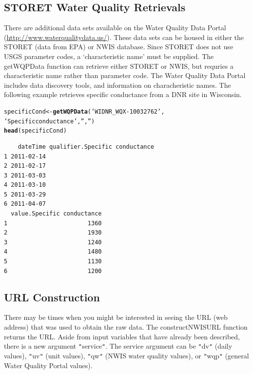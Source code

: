 \documentclass[a4paper,11pt]{article}\usepackage[]{graphicx}\usepackage[]{color}
\makeatletter
\newcommand{\hlstr}[1]{\textcolor[rgb]{0.192,0.494,0.8}{#1}}%
\newcommand{\hlstd}[1]{\textcolor[rgb]{0.345,0.345,0.345}{#1}}%
\newcommand{\hlkwb}[1]{\textcolor[rgb]{0.69,0.353,0.396}{#1}}%
\newcommand{\hlkwd}[1]{\textcolor[rgb]{0.737,0.353,0.396}{\textbf{#1}}}%
\newenvironment{kframe}{%
 \def\at@end@of@kframe{}%
 \ifinner\ifhmode%
  \def\at@end@of@kframe{\end{minipage}}%
  \begin{minipage}{\columnwidth}%
 \fi\fi%
 \def\FrameCommand##1{\hskip\@totalleftmargin \hskip-\fboxsep
 \colorbox{shadecolor}{##1}\hskip-\fboxsep
     \hskip-\linewidth \hskip-\@totalleftmargin \hskip\columnwidth}%
 \MakeFramed {\advance\hsize-\width
   \@totalleftmargin\z@ \linewidth\hsize
   \@setminipage}}%
 {\par\unskip\endMakeFramed%
 \at@end@of@kframe}
\newenvironment{knitrout}{}{} %
\makeatother
\begin{document}
\subsection{STORET Water Quality Retrievals}
\label{sec:usgsSTORET}
There are additional data sets available on the Water Quality Data Portal (\url{http://www.waterqualitydata.us/}).  These data sets can be housed in either the STORET (data from EPA) or NWIS database.  Since STORET does not use USGS parameter codes, a `characteristic name' must be supplied.  The getWQPData function can retrieve either STORET or NWIS, but requries a characteristic name rather than parameter code. The Water Quality Data Portal includes data discovery tools, and information on characheristic names. The following example retrieves specific conductance from a DNR site in Wisconsin. 


\begin{knitrout}
\color{fgcolor}\begin{kframe}
\begin{alltt}
\hlstd{specificCond} \hlkwb{<-} \hlkwd{getWQPData}\hlstd{(}\hlstr{'WIDNR_WQX-10032762'}\hlstd{,}
        \hlstr{'Specific conductance'}\hlstd{,} \hlstr{''}\hlstd{,} \hlstr{''}\hlstd{)}
\hlkwd{head}\hlstd{(specificCond)}
\end{alltt}
\begin{verbatim}
    dateTime qualifier.Specific conductance
1 2011-02-14                               
2 2011-02-17                               
3 2011-03-03                               
4 2011-03-10                               
5 2011-03-29                               
6 2011-04-07                               
  value.Specific conductance
1                       1360
2                       1930
3                       1240
4                       1480
5                       1130
6                       1200
\end{verbatim}
\end{kframe}
\end{knitrout}


\FloatBarrier
\subsection{URL Construction}
\label{sec:usgsURL}
There may be times when you might be interested in seeing the URL (web address) that was used to obtain the raw data. The constructNWISURL function returns the URL.  Aside from input variables that have already been described, there is a new argument \texttt{"}service\texttt{"}. The service argument can be \texttt{"}dv\texttt{"} (daily values), \texttt{"}uv\texttt{"} (unit values), \texttt{"}qw\texttt{"} (NWIS water quality values), or \texttt{"}wqp\texttt{"} (general Water Quality Portal values).
 
\end{document}
